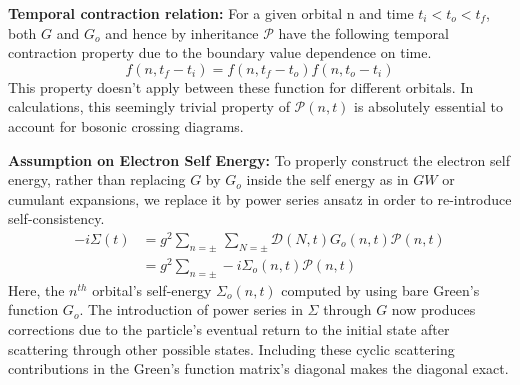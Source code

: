 \documentclass[%
 reprint,
 amsmath,amssymb,
 aps,prl,
floatfix
]{revtex4-2}
\begin{document}
\textbf{Temporal contraction relation: } For a given orbital n and time $t_i<t_o<t_f$, both $G$ and $G_o$ and hence by inheritance $\mathcal{P}$ have the following temporal contraction property due to the boundary value dependence on time. 
\begin{equation}
    f(n,t_f-t_i) = f(n,t_f-t_o)f(n,t_o-t_i)
    \label{contraction}
\end{equation}
This property doesn't apply between these function for different orbitals. In calculations, this seemingly trivial property of $\mathcal{P}(n,t)$ is absolutely essential to account for bosonic crossing diagrams. 

\textbf{Assumption on Electron Self Energy: }To properly construct the electron self energy, rather than replacing $G$ by $G_o$ inside the self energy as in $GW$ or cumulant expansions, we replace it by power series ansatz in order to re-introduce self-consistency.
\begin{equation}
\begin{aligned}
    -i\Sigma(t) &= g^2 \sum_{n=\pm}\,\sum_{N= \pm} \mathcal{D}(N,t)G_o(n, t)\mathcal{P}(n,t)\\
    &=g^2 \sum_{n=\pm}-i\Sigma_o(n,t)\mathcal{P}(n,t)
\end{aligned}
\label{Power corrected self energy}
\end{equation}
Here, the $n^{th}$ orbital's self-energy $\Sigma_o(n,t)$ computed by using bare Green's function $G_o$. The introduction of power series in $\Sigma$ through $G$ now produces corrections due to the particle's eventual return to the initial state after scattering through other possible states. Including these cyclic scattering contributions in the Green's function matrix's diagonal makes the diagonal exact.
\end{document}
